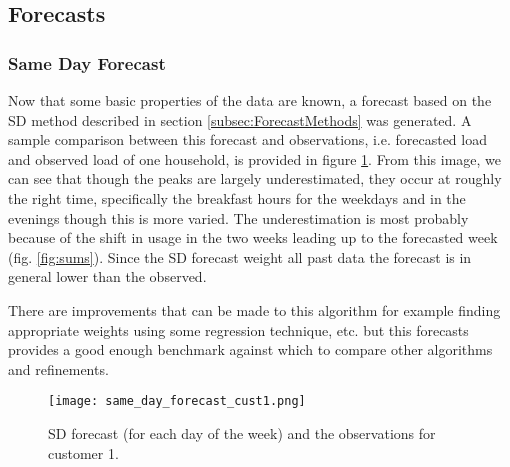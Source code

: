 \documentclass[a4paper]{article}
\begin{document}



\subsection{Forecasts}
\label{subsec:forecasts}

\subsubsection{Same Day Forecast} \label{subsubsec:SD_res}
Now that some basic properties of the data are known, a forecast based on the SD method described in section \ref{subsec:ForecastMethods} was generated. A sample comparison between this forecast and observations, i.e. forecasted load and observed load of one household, is provided in figure \ref{fig:SDforecast}. From this image, we can see that though the peaks are largely underestimated, they occur at roughly the right time, specifically the breakfast hours for the weekdays and in the evenings though this is more varied. The underestimation is most probably because of the shift in usage in the two weeks leading up to the forecasted week (fig. \ref{fig:sums}). Since the SD forecast weight all past data the forecast is in general lower than the observed.

There are improvements that can be made to this algorithm for example finding appropriate weights using some regression technique, etc. but this forecasts provides a good enough benchmark against which to compare other algorithms and refinements.


\begin{figure}
\centering
\texttt{[image: same\_day\_forecast\_cust1.png]}
\caption{SD forecast (for each day of the week) and the observations for customer 1.}
\label{fig:SDforecast} 
\end{figure}
\end{document}
